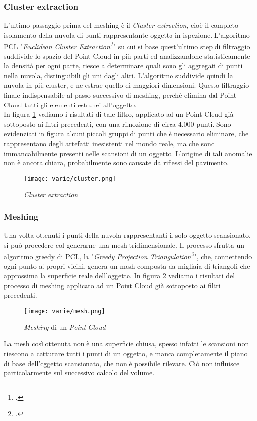\subsubsection{Cluster extraction}
L'ultimo passaggio prima del meshing è il \emph{Cluster extraction}, cioè il completo isolamento della nuvola di punti rappresentante oggetto in ispezione.
L'algoritmo PCL "\emph{Euclidean Cluster Extraction\footcite{http://www.pointclouds.org/documentation/tutorials/cluster_extraction.php}}" su cui si base quest'ultimo step di filtraggio suddivide lo spazio del Point Cloud in più parti ed analizzandone statisticamente la densità per ogni parte, riesce a determinare quali sono  gli aggregati di punti nella nuvola, distinguibili gli uni dagli altri.
L'algoritmo suddivide quindi la nuvola in più cluster, e ne estrae quello di maggiori dimensioni. Questo filtraggio finale indispensabile al passo successivo di meshing, perchè elimina dal Point Cloud tutti gli elementi estranei all'oggetto.\\
In figura \ref{fig:cluster} vediamo i risultati di tale filtro, applicato ad un Point Cloud già sottoposto ai filtri precedenti, con una rimozione di circa 4.000 punti. Sono evidenziati in figura alcuni piccoli gruppi di punti che è necessario eliminare, che rappresentano degli artefatti inesistenti nel mondo reale, ma che sono immancabilmente presenti nelle scansioni di un oggetto. L'origine di tali anomalie non è ancora chiara, probabilmente sono causate da riflessi del pavimento.
\begin{figure}[!h] 
    \centering 
    \texttt{[image: varie/cluster.png]} 
    \caption{\emph{Cluster extraction}}
    \label{fig:cluster}
\end{figure}

\subsubsection{Meshing}
Una volta ottenuti i punti della nuvola rappresentanti il solo oggetto scansionato, si può procedere col generarne una mesh tridimensionale.
Il processo sfrutta un algoritmo greedy di PCL, la "\emph{Greedy Projection Triangulation\footcite{http://www.pointclouds.org/documentation/tutorials/greedy_projection.php}}", che, connettendo ogni punto ai propri vicini, genera un mesh composta da migliaia di triangoli che approssima la superficie reale dell'oggetto.
In figura \ref{fig:mesh} vediamo i risultati del processo di meshing applicato ad un Point Cloud già sottoposto ai filtri precedenti.
\begin{figure}[!h] 
    \centering 
    \texttt{[image: varie/mesh.png]} 
    \caption{\emph{Meshing} di un \emph{Point Cloud}}
    \label{fig:mesh}
\end{figure}
\newline
La mesh così ottenuta non è una superficie chiusa, spesso infatti le scansioni non riescono a catturare tutti i punti di un oggetto, e manca completamente il piano di base dell'oggetto scansionato, che non è possibile rilevare. Ciò non influisce particolarmente sul successivo calcolo del volume.

